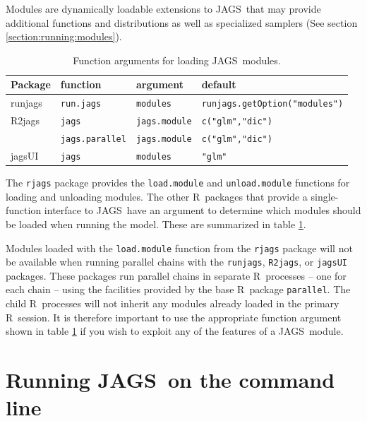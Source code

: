 \documentclass[11pt, a4paper, titlepage]{report}
\newcommand{\JAGS}{\textsf{JAGS}}
\newcommand{\R}{\textsf{R}}
\begin{document}
Modules are dynamically loadable extensions to \JAGS\ that may provide
additional functions and distributions as well as specialized
samplers (See section \ref{section:running:modules}).

\begin{table}
\begin{tabular}{llll}
  \hline
  Package & function & argument & default \\
  \hline
  runjags & \texttt{run.jags} & \texttt{modules} & \texttt{runjags.getOption("modules")} \\
  R2jags  & \texttt{jags} & \texttt{jags.module} & \texttt{c("glm","dic")} \\
  & \texttt{jags.parallel} & \texttt{jags.module} & \texttt{c("glm","dic")} \\
  jagsUI  & \texttt{jags} & \texttt{modules} & \texttt{"glm"} \\
  \hline
\end{tabular}
\caption{Function arguments for loading \JAGS\ modules. \label{table:modules}}
\end{table}

The \texttt{rjags} package provides the \texttt{load.module} and
\texttt{unload.module} functions for loading and unloading
modules. The other \R\ packages that provide a single-function
interface to \JAGS\ have an argument to determine which modules should
be loaded when running the model. These are summarized in table
\ref{table:modules}.

Modules loaded with the \texttt{load.module} function from the
\texttt{rjags} package will not be available when running parallel
chains with the \texttt{runjags}, \texttt{R2jags}, or \texttt{jagsUI}
packages. These packages run parallel chains in separate \R\ processes
-- one for each chain -- using the facilities provided by the base \R\ 
package \texttt{parallel}. The child \R\ processes will not inherit any
modules already loaded in the primary \R\ session. It is therefore
important to use the appropriate function argument shown in table
\ref{table:modules} if you wish to exploit any of the features of a
\JAGS\ module.


\chapter{Running \JAGS\ on the command line}
\label{chapter:cmdline}
\end{document}
